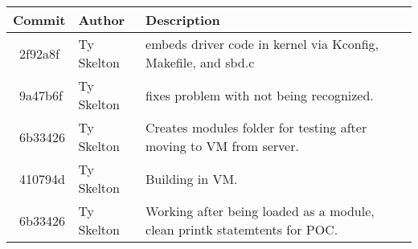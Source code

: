 \begin{tabular}{l l l}\textbf{Commit} & \textbf{Author} & \textbf{Description}\\\hline
\ 2f92a8f & Ty Skelton & embeds driver code in kernel via Kconfig, Makefile, and sbd.c\\\hline
\ 9a47b6f & Ty Skelton & fixes problem with not being recognized.\\\hline
\ 6b33426 & Ty Skelton & Creates modules folder for testing after moving to VM from server.\\\hline
\ 410794d & Ty Skelton & Building in VM.\\\hline
\ 6b33426 & Ty Skelton & Working after being loaded as a module, clean printk statemtents for POC.\\\hline
\end{tabular}
